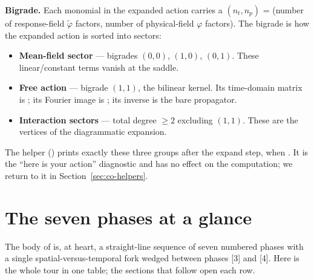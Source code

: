 \begin{defn}
\textbf{Bigrade.} Each monomial in the expanded action carries a 
$(n_t, n_p)$ = (number of response-field $\tilde\varphi$ factors, number of
physical-field $\varphi$ factors). The bigrade is how the expanded action is
sorted into sectors:
\begin{itemize}
  \item \textbf{Mean-field sector} --- bigrades $(0,0)$, $(1,0)$, $(0,1)$. These
        linear/constant terms vanish at the saddle.
  \item \textbf{Free action} --- bigrade $(1,1)$, the bilinear kernel. Its
        time-domain matrix is ; its Fourier image is ;
        its inverse  is the bare propagator.
  \item \textbf{Interaction sectors} --- total degree $\ge 2$ excluding $(1,1)$.
        These are the vertices of the diagrammatic expansion.
\end{itemize}
\end{defn}

The helper  () prints
exactly these three groups after the expand step, when . It is
the ``here is your action'' diagnostic and has no effect on the computation; we
return to it in Section~\ref{sec:co-helpers}.

\section{The seven phases at a glance}\label{sec:co-glance}

The body of  is, at heart, a straight-line sequence of
seven numbered phases with a single spatial-versus-temporal fork wedged between
phases [3] and [4]. Here is the whole tour in one table; the sections that follow
open each row.

